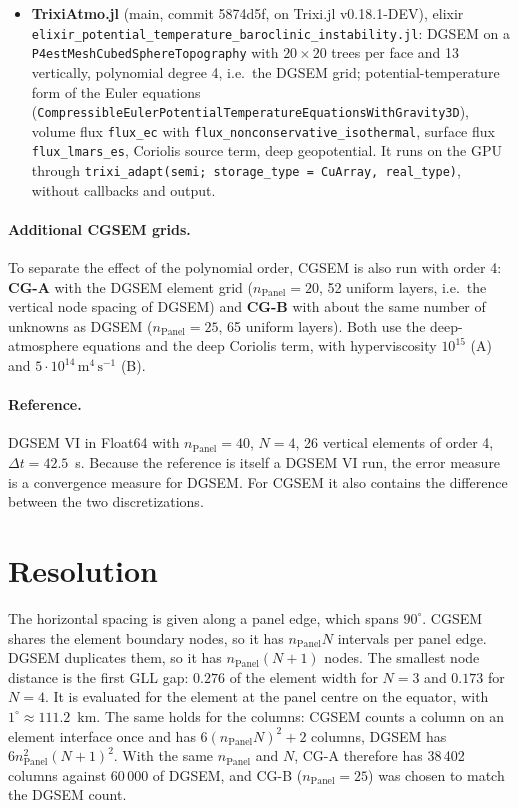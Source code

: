 \documentclass[11pt,a4paper]{article}
\newcommand{\code}[1]{\texttt{#1}}
\begin{document}
\begin{itemize}
\item \textbf{TrixiAtmo.jl} (main, commit 5874d5f, on Trixi.jl v0.18.1-DEV),
  elixir \code{elixir\_potential\_temperature\_baroclinic\_instability.jl}:
  DGSEM on a \code{P4estMeshCubedSphereTopography} with $20\times20$ trees per
  face and 13 vertically, polynomial degree 4, i.e.\ the DGSEM grid;
  potential-temperature form of the Euler equations
  (\code{CompressibleEulerPotentialTemperatureEquationsWithGravity3D}),
  volume flux \code{flux\_ec} with \code{flux\_nonconservative\_isothermal},
  surface flux \code{flux\_lmars\_es}, Coriolis source term, deep geopotential.
  It runs on the GPU through \code{trixi\_adapt(semi; storage\_type = CuArray,
  real\_type)}, without callbacks and output.
\end{itemize}

\paragraph{Additional CGSEM grids.} To separate the effect of the
polynomial order, CGSEM is also run with order 4:
\textbf{CG-A} with the DGSEM element grid ($n_\text{Panel}=20$, 52
uniform layers, i.e.\ the vertical node spacing of DGSEM) and
\textbf{CG-B} with about the same number of unknowns as DGSEM
($n_\text{Panel}=25$, 65 uniform layers). Both use the
deep-atmosphere equations and the deep Coriolis term, with
hyperviscosity $10^{15}$ (A) and $5\cdot10^{14}\,\mathrm{m^4\,s^{-1}}$ (B).

\paragraph{Reference.} DGSEM VI in Float64 with $n_\text{Panel}=40$,
$N=4$, 26 vertical elements of order 4, $\Delta t=42.5$~s.
Because the reference is itself a DGSEM VI run, the error measure
is a convergence measure for DGSEM. For CGSEM it also contains the
difference between the two discretizations.

\section{Resolution}

The horizontal spacing is given along a panel edge, which
spans $90^\circ$. CGSEM shares the element boundary nodes, so it has
$n_\text{Panel}N$ intervals per panel edge. DGSEM duplicates them, so
it has $n_\text{Panel}(N+1)$ nodes. The smallest node distance is the
first GLL gap: $0.276$ of the element width for $N=3$ and $0.173$ for
$N=4$. It is evaluated for the element at the panel centre on the
equator, with $1^\circ \approx 111.2$~km.
The same holds for the columns: CGSEM counts a column on an element
interface once and has $6(n_\text{Panel}N)^2+2$ columns, DGSEM has
$6n_\text{Panel}^2(N+1)^2$. With the same $n_\text{Panel}$ and $N$,
CG-A therefore has 38\,402 columns against 60\,000 of DGSEM, and CG-B
($n_\text{Panel}=25$) was chosen to match the DGSEM count.
\end{document}

